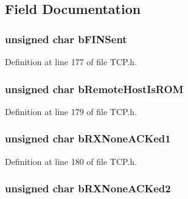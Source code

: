 \subsection{Field Documentation}
\hypertarget{struct_t_c_b_ae7e84a3fa64de6e94ad093b762400e10}{}
\subsubsection[{b\+F\+I\+N\+Sent}]{\setlength{\rightskip}{0pt plus 5cm}unsigned char b\+F\+I\+N\+Sent}\label{struct_t_c_b_ae7e84a3fa64de6e94ad093b762400e10}


Definition at line 177 of file T\+C\+P.\+h.

\hypertarget{struct_t_c_b_a85e50d5129c9eaec6e4729cb5aacf312}{}
\subsubsection[{b\+Remote\+Host\+Is\+R\+O\+M}]{\setlength{\rightskip}{0pt plus 5cm}unsigned char b\+Remote\+Host\+Is\+R\+O\+M}\label{struct_t_c_b_a85e50d5129c9eaec6e4729cb5aacf312}


Definition at line 179 of file T\+C\+P.\+h.

\hypertarget{struct_t_c_b_acd4766b3fc8c443d8aceb1920fc58677}{}
\subsubsection[{b\+R\+X\+None\+A\+C\+Ked1}]{\setlength{\rightskip}{0pt plus 5cm}unsigned char b\+R\+X\+None\+A\+C\+Ked1}\label{struct_t_c_b_acd4766b3fc8c443d8aceb1920fc58677}


Definition at line 180 of file T\+C\+P.\+h.

\hypertarget{struct_t_c_b_a22ffb6306d775b5180f9d9691240df08}{}
\subsubsection[{b\+R\+X\+None\+A\+C\+Ked2}]{\setlength{\rightskip}{0pt plus 5cm}unsigned char b\+R\+X\+None\+A\+C\+Ked2}\label{struct_t_c_b_a22ffb6306d775b5180f9d9691240df08}


